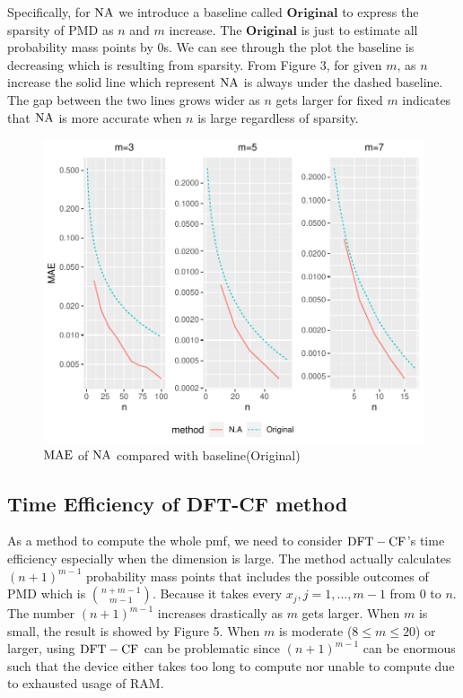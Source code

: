 \documentclass[12pt]{article}
\newcommand{\MAE}{{\rm MAE}}
\newcommand{\PMD}{\textrm{PMD}}
\newcommand{\NA}{{\rm NA}}
\newcommand{\dft}{{\rm DFT-CF}}
\begin{document}
Specifically, for $\NA$ we introduce a baseline called $\textbf{Original}$ to express the sparsity of $\PMD$ as $n$ and $m$ increase. The $\textbf{Original}$ is just to estimate all probability mass points by 0s. We can see through the plot the baseline is decreasing which is resulting from sparsity. From Figure 3, for given $m$, as $n$ increase the solid line which represent $\NA$ is always under the dashed baseline. The gap between the two lines grows wider as $n$ gets larger for fixed $m$ indicates that $\NA$ is more accurate when $n$ is large regardless of sparsity.
\begin{figure}[h]
	\centering
	\includegraphics[scale=0.8]{figures/mae.pdf}
	\caption{$\MAE$ of $\NA$ compared with baseline(Original)}
	\label{fig: dft accuracy}
\end{figure}



\subsection{Time Efficiency of DFT-CF method}
As a method to compute the whole pmf, we need to consider $\dft$'s time efficiency especially when the dimension is large. The method actually calculates $(n+1)^{m-1}$ probability mass points that includes the possible outcomes of $\PMD$ which is $\binom{n+m-1}{m-1}$. Because it takes every $x_j,j=1,\dots,m-1$ from 0 to $n$. The number $(n+1)^{m-1}$ increases drastically as $m$ gets larger. When $m$ is small, the result is showed by Figure 5. When $m$ is moderate ($8 \leq m \leq 20$) or larger, using $\dft$ can be problematic since $(n+1)^{m-1}$ can be enormous such that the device either takes too long to compute nor unable to compute due to exhausted usage of RAM. 
\end{document}
